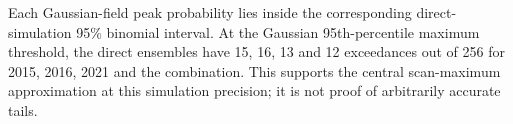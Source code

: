 Each Gaussian-field peak probability lies inside the corresponding direct-simulation 95\% binomial interval. At the Gaussian 95th-percentile maximum threshold, the direct ensembles have 15, 16, 13 and 12 exceedances out of 256 for 2015, 2016, 2021 and the combination. This supports the central scan-maximum approximation at this simulation precision; it is not proof of arbitrarily accurate tails.
